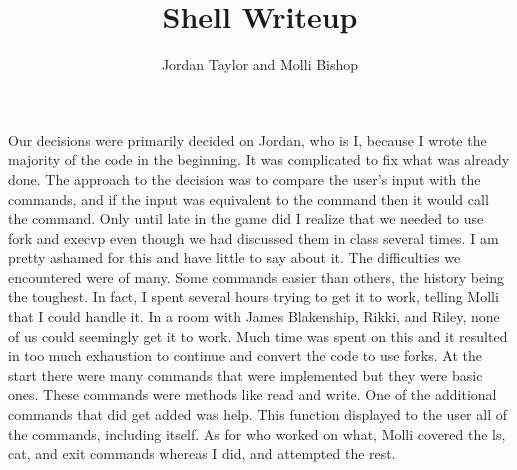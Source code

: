 \documentclass[12pt,letterpaper,notitlepage]{report}
\title{Shell Writeup}
\author{Jordan Taylor and Molli Bishop}
\begin{document}
\maketitle
\begin{quad}
Our decisions were primarily decided on Jordan, who is I, because I wrote the majority of the code in the beginning. It was complicated to fix what was already done. The approach to the decision was to compare the user's input with the commands, and if the input was equivalent to the command then it would call the command. Only until late in the game did I realize that we needed to use fork and execvp even though we had discussed them in class several times. I am pretty ashamed for this and have little to say about it. The difficulties we encountered were of many. Some commands easier than others, the history being the toughest. In fact, I spent several hours trying to get it to work, telling Molli that I could handle it. In a room with James Blakenship, Rikki, and Riley, none of us could seemingly get it to work. Much time was spent on this and it resulted in too much exhaustion to continue and convert the code to use forks. At the start there were many commands that were implemented but they were basic ones. These commands were methods like read and write. One of the additional commands that did get added was help. This function displayed to the user all of the commands, including itself. As for who worked on what, Molli covered the ls, cat, and exit commands whereas I did, and attempted the rest.
\newline
\end{quad}
\end{document}

